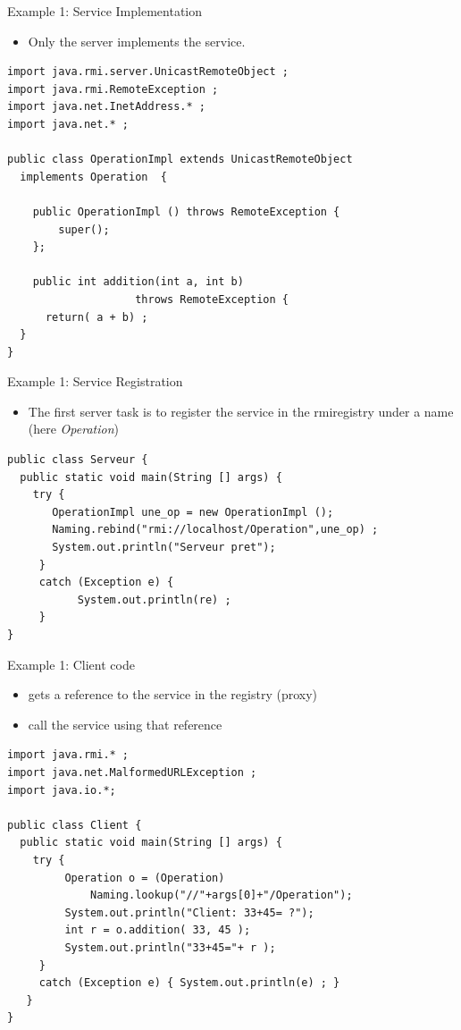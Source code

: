 \documentclass[bigger,hyperref={colorlinks=true, urlcolor=red, plainpages=false, pdfpagelabels, bookmarksnumbered}]{beamer}
\begin{document}
\begin{frame}[fragile,label=sec-3-9]{Example 1: Service Implementation}
 \begin{itemize}
\item Only the server \alert{implements} the service.
\end{itemize}
\lstset{language=java,label= ,caption= ,numbers=none}
\begin{lstlisting}
import java.rmi.server.UnicastRemoteObject ;
import java.rmi.RemoteException ;
import java.net.InetAddress.* ;
import java.net.* ;

public class OperationImpl extends UnicastRemoteObject
  implements Operation  {

    public OperationImpl () throws RemoteException {
        super();
    };

    public int addition(int a, int b) 
                    throws RemoteException {
      return( a + b) ;
  }
}
\end{lstlisting}
\end{frame}

\begin{frame}[fragile,label=sec-3-10]{Example 1: Service Registration}
 \begin{itemize}
\item The first server task is to register the service 
in the rmiregistry under a name (here \emph{Operation})
\end{itemize}

\lstset{language=java,label= ,caption= ,numbers=none}
\begin{lstlisting}
public class Serveur {
  public static void main(String [] args) {
    try {
       OperationImpl une_op = new OperationImpl ();
       Naming.rebind("rmi://localhost/Operation",une_op) ;
       System.out.println("Serveur pret");
     }
     catch (Exception e) { 
           System.out.println(re) ; 
     }
}
\end{lstlisting}
\end{frame}

\begin{frame}[fragile,label=sec-3-11]{Example 1: Client code}
 \begin{itemize}
\item gets a reference to the service in the registry (proxy)
\item call the service using that reference
\end{itemize}

\lstset{language=java,label= ,caption= ,numbers=none}
\begin{lstlisting}
import java.rmi.* ;
import java.net.MalformedURLException ;
import java.io.*;

public class Client {
  public static void main(String [] args) {
    try {
         Operation o = (Operation) 
             Naming.lookup("//"+args[0]+"/Operation");
         System.out.println("Client: 33+45= ?");
         int r = o.addition( 33, 45 );
         System.out.println("33+45="+ r );
     }
     catch (Exception e) { System.out.println(e) ; }
   }
}
\end{lstlisting}
\end{frame}
\end{document}

